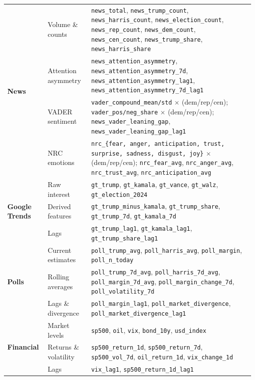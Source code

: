 \begin{longtable}{@{} p{2.3cm} p{3.6cm} p{8.7cm} @{}}
\multirow{4}{*}{\textbf{News}}
  & Volume \& counts
  & \texttt{news\_total}, \texttt{news\_trump\_count}, \texttt{news\_harris\_count},
    \texttt{news\_election\_count}, \texttt{news\_rep\_count}, \texttt{news\_dem\_count},
    \texttt{news\_cen\_count}, \texttt{news\_trump\_share}, \texttt{news\_harris\_share} \\
  & Attention asymmetry
  & \texttt{news\_attention\_asymmetry}, \texttt{news\_attention\_asymmetry\_7d},
    \texttt{news\_attention\_asymmetry\_lag1}, \texttt{news\_attention\_asymmetry\_7d\_lag1} \\
  & VADER sentiment
  & \texttt{vader\_compound\_mean/std} $\times$ (dem/rep/cen);
    \texttt{vader\_pos/neg\_share} $\times$ (dem/rep/cen);
    \texttt{news\_vader\_leaning\_gap}, \texttt{news\_vader\_leaning\_gap\_lag1} \\
  & NRC emotions
  & \texttt{nrc\_\{fear, anger, anticipation, trust, surprise, sadness, disgust, joy\}}
    $\times$ (dem/rep/cen);
    \texttt{nrc\_fear\_avg}, \texttt{nrc\_anger\_avg},
    \texttt{nrc\_trust\_avg}, \texttt{nrc\_anticipation\_avg} \\
\midrule

\multirow{3}{*}{\textbf{Google Trends}}
  & Raw interest
  & \texttt{gt\_trump}, \texttt{gt\_kamala}, \texttt{gt\_vance},
    \texttt{gt\_walz}, \texttt{gt\_election\_2024} \\
  & Derived features
  & \texttt{gt\_trump\_minus\_kamala}, \texttt{gt\_trump\_share},
    \texttt{gt\_trump\_7d}, \texttt{gt\_kamala\_7d} \\
  & Lags
  & \texttt{gt\_trump\_lag1}, \texttt{gt\_kamala\_lag1},
    \texttt{gt\_trump\_share\_lag1} \\
\midrule

\multirow{3}{*}{\textbf{Polls}}
  & Current estimates
  & \texttt{poll\_trump\_avg}, \texttt{poll\_harris\_avg},
    \texttt{poll\_margin}, \texttt{poll\_n\_today} \\
  & Rolling averages
  & \texttt{poll\_trump\_7d\_avg}, \texttt{poll\_harris\_7d\_avg},
    \texttt{poll\_margin\_7d\_avg}, \texttt{poll\_margin\_change\_7d},
    \texttt{poll\_volatility\_7d} \\
  & Lags \& divergence
  & \texttt{poll\_margin\_lag1}, \texttt{poll\_market\_divergence},
    \texttt{poll\_market\_divergence\_lag1} \\
\midrule

\multirow{3}{*}{\textbf{Financial}}
  & Market levels
  & \texttt{sp500}, \texttt{oil}, \texttt{vix}, \texttt{bond\_10y},
    \texttt{usd\_index} \\
  & Returns \& volatility
  & \texttt{sp500\_return\_1d}, \texttt{sp500\_return\_7d},
    \texttt{sp500\_vol\_7d}, \texttt{oil\_return\_1d}, \texttt{vix\_change\_1d} \\
  & Lags
  & \texttt{vix\_lag1}, \texttt{sp500\_return\_1d\_lag1} \\

\end{longtable}
